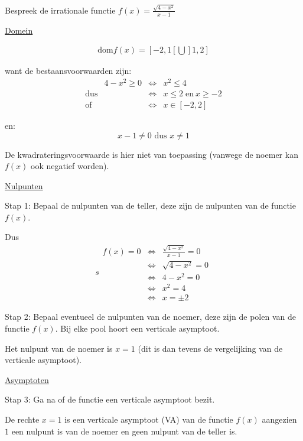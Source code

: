\begin{voorbeeld}
	Bespreek de irrationale functie $f(x)=\frac{\sqrt{4-x^{2}}}{x-1}$

\underline{Domein}

\begin{eqnarray}
\textrm{dom}f(x)=[-2,1[\bigcup]1,2]
\end{eqnarray}

want de bestaansvoorwaarden zijn:  
\begin{equation*}
\begin{array}{ccclcc}
& 4-x^{2}\geq0 & \iff & x^{2}\leq4\\
\textrm{dus} & & \iff & x\leq2\;\textrm{en}\:x\geq-2\\
\textrm{of} & & \iff & x\in[-2,2]
\end{array}
\end{equation*}

en:
\begin{equation*}
x-1\neq0 \textrm{ dus } x\neq1
\end{equation*}

De kwadrateringsvoorwaarde is hier niet van toepassing (vanwege de
noemer kan $f(x)$ ook negatief worden).

\underline{Nulpunten}

Stap 1: Bepaal de nulpunten van de teller, deze zijn de nulpunten
van de functie $f(x)$.

Dus 
\begin{equation*}s
\begin{array}{ccc}
f(x)=0 & \iff & \frac{\sqrt{4-x^{2}}}{x-1} = 0\\
& \iff & \sqrt{4-x^{2}} = 0\\
& \iff & 4-x^{2} = 0\\
& \iff & x^{2} = 4\\
& \iff & x = \pm2
\end{array}
\end{equation*}

Stap 2: Bepaal eventueel de nulpunten van de noemer, deze zijn de
polen van de functie $f(x)$. Bij elke pool hoort een verticale asymptoot.

Het nulpunt van de noemer is $x=1$ (dit is dan tevens de vergelijking
van de verticale asymptoot).

\underline{Asymptoten}

Stap 3: Ga na of de functie een verticale asymptoot bezit. 

De rechte $x=1$ is een verticale asymptoot (VA) van de functie $f(x)$
aangezien $1$ een nulpunt is van de noemer en geen nulpunt van de
teller is.


\end{voorbeeld}

